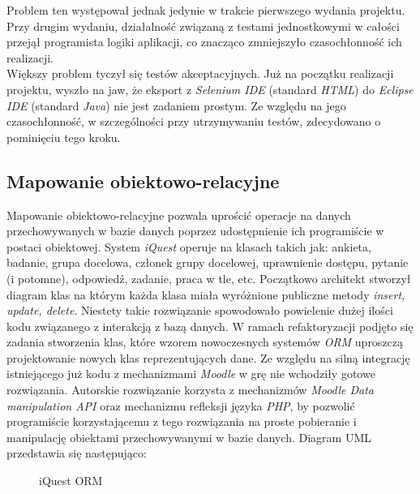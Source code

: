 Problem ten występował jednak jedynie w trakcie pierwszego wydania projektu. Przy drugim wydaniu, działalność związaną z testami jednostkowymi w całości przejął programista logiki aplikacji, co znacząco zmniejszyło czasochłonność ich realizacji. \\

Większy problem tyczył się testów akceptacyjnych. Już na początku realizacji projektu, wyszło na jaw, że eksport z \textit{Selenium IDE} (standard \textit{HTML}) do \textit{Eclipse IDE} (standard \textit{Java}) nie jest zadaniem prostym. Ze względu na jego czasochłonność, w szczególności przy utrzymywaniu testów, zdecydowano o pominięciu tego kroku. \\

\subsection{Mapowanie obiektowo-relacyjne}
\label{Chapter62c}

Mapowanie obiektowo-relacyjne pozwala uprościć operacje na danych przechowywanych w bazie danych poprzez udostępnienie ich programiście w postaci obiektowej. System \textit{iQuest} operuje na klasach takich jak: ankieta, badanie, grupa docelowa, członek grupy docelowej, uprawnienie dostępu, pytanie (i potomne), odpowiedź, zadanie, praca w tle, etc. Początkowo architekt stworzył diagram klas na którym każda klasa miała wyróżnione publiczne metody \textit{insert, update, delete}. Niestety takie rozwiązanie spowodowało powielenie dużej ilości kodu związanego z interakcją z bazą danych. W ramach refaktoryzacji podjęto się zadania stworzenia klas, które wzorem nowoczesnych systemów \textit{ORM} uproszczą projektowanie nowych klas reprezentujących dane. Ze względu na silną integrację istniejącego już kodu z mechanizmami \textit{Moodle} w grę nie wchodziły gotowe rozwiązania. Autorskie rozwiązanie korzysta z mechanizmów \textit{Moodle Data manipulation API} oraz mechanizmu refleksji języka \textit{PHP}, by pozwolić programiście korzystającemu z tego rozwiązania na proste pobieranie i manipulację obiektami przechowywanymi w bazie danych. Diagram UML przedstawia się następująco:

\newpage
\begin{figure}[H]
\begin{center}
 
\end{center}
\caption{iQuest ORM}\label{fig:iquest-orm}
\end{figure}
\newpage

